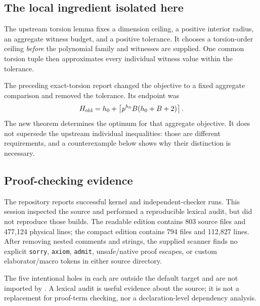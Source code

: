 \subsection{The local ingredient isolated here}
The upstream torsion lemma fixes a dimension ceiling, a positive interior radius, an aggregate witness budget, and a positive tolerance. It chooses a torsion-order ceiling \emph{before} the polynomial family and witnesses are supplied. One common torsion tuple then approximates every individual witness value within the tolerance.

The preceding exact-torsion report changed the objective to a fixed aggregate comparison and removed the tolerance. Its endpoint was
\[
 H_{\mathrm{old}}
 =h_0+\left\lceil p^{h_0}B(h_0+B+2)\right\rceil.
\]
The new theorem determines the optimum for that aggregate objective. It does not supersede the upstream individual inequalities: those are different requirements, and a counterexample below shows why their distinction is necessary.

\subsection{Proof-checking evidence}
The repository reports successful kernel and independent-checker runs. This session inspected the source and performed a reproducible lexical audit, but did not reproduce those builds. The readable edition contains 803 source files and 477,124 physical lines; the compact edition contains 794 files and 112,827 lines. After removing nested comments and strings, the supplied scanner finds no explicit \texttt{sorry}, \texttt{axiom}, \texttt{admit}, unsafe/native proof escapes, or custom elaborator/macro tokens in either source directory.

The five intentional holes in each  are outside the default target and are not imported by . A lexical audit is useful evidence about the source; it is not a replacement for proof-term checking, nor a declaration-level dependency analysis.

